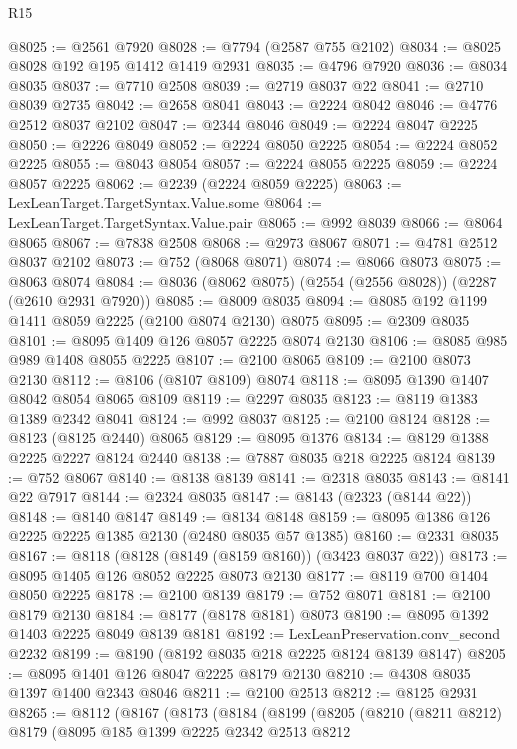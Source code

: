 \begin{lexlean}{R15}
\begin{coremodule}
@8025 := @2561 @7920
@8028 := @7794 (@2587 @755 @2102)
@8034 := @8025 @8028 @192 @195 @1412 @1419 @2931
@8035 := @4796 @7920
@8036 := @8034 @8035
@8037 := @7710 @2508
@8039 := @2719 @8037 @22
@8041 := @2710 @8039 @2735
@8042 := @2658 @8041
@8043 := @2224 @8042
@8046 := @4776 @2512 @8037 @2102
@8047 := @2344 @8046
@8049 := @2224 @8047 @2225
@8050 := @2226 @8049
@8052 := @2224 @8050 @2225
@8054 := @2224 @8052 @2225
@8055 := @8043 @8054
@8057 := @2224 @8055 @2225
@8059 := @2224 @8057 @2225
@8062 := @2239 (@2224 @8059 @2225)
@8063 := LexLeanTarget.TargetSyntax.Value.some
@8064 := LexLeanTarget.TargetSyntax.Value.pair
@8065 := @992 @8039
@8066 := @8064 @8065
@8067 := @7838 @2508
@8068 := @2973 @8067
@8071 := @4781 @2512 @8037 @2102
@8073 := @752 (@8068 @8071)
@8074 := @8066 @8073
@8075 := @8063 @8074
@8084 := @8036 (@8062 @8075) (@2554 (@2556 @8028)) (@2287 (@2610 @2931 @7920))
@8085 := @8009 @8035
@8094 := @8085 @192 @1199 @1411 @8059 @2225 (@2100 @8074 @2130) @8075
@8095 := @2309 @8035
@8101 := @8095 @1409 @126 @8057 @2225 @8074 @2130
@8106 := @8085 @985 @989 @1408 @8055 @2225
@8107 := @2100 @8065
@8109 := @2100 @8073 @2130
@8112 := @8106 (@8107 @8109) @8074
@8118 := @8095 @1390 @1407 @8042 @8054 @8065 @8109
@8119 := @2297 @8035
@8123 := @8119 @1383 @1389 @2342 @8041
@8124 := @992 @8037
@8125 := @2100 @8124
@8128 := @8123 (@8125 @2440) @8065
@8129 := @8095 @1376
@8134 := @8129 @1388 @2225 @2227 @8124 @2440
@8138 := @7887 @8035 @218 @2225 @8124
@8139 := @752 @8067
@8140 := @8138 @8139
@8141 := @2318 @8035
@8143 := @8141 @22 @7917
@8144 := @2324 @8035
@8147 := @8143 (@2323 (@8144 @22))
@8148 := @8140 @8147
@8149 := @8134 @8148
@8159 := @8095 @1386 @126 @2225 @2225 @1385 @2130 (@2480 @8035 @57 @1385)
@8160 := @2331 @8035
@8167 := @8118 (@8128 (@8149 (@8159 @8160)) (@3423 @8037 @22))
@8173 := @8095 @1405 @126 @8052 @2225 @8073 @2130
@8177 := @8119 @700 @1404 @8050 @2225
@8178 := @2100 @8139
@8179 := @752 @8071
@8181 := @2100 @8179 @2130
@8184 := @8177 (@8178 @8181) @8073
@8190 := @8095 @1392 @1403 @2225 @8049 @8139 @8181
@8192 := LexLeanPreservation.conv_second @2232
@8199 := @8190 (@8192 @8035 @218 @2225 @8124 @8139 @8147)
@8205 := @8095 @1401 @126 @8047 @2225 @8179 @2130
@8210 := @4308 @8035 @1397 @1400 @2343 @8046
@8211 := @2100 @2513
@8212 := @8125 @2931
@8265 := @8112
    (@8167
      (@8173
        (@8184
          (@8199
            (@8205
              (@8210
                (@8211 @8212)
                @8179
                (@8095
                  @185
                  @1399
                  @2225
                  @2342
                  @2513
                  @8212

\end{coremodule}
\end{lexlean}
